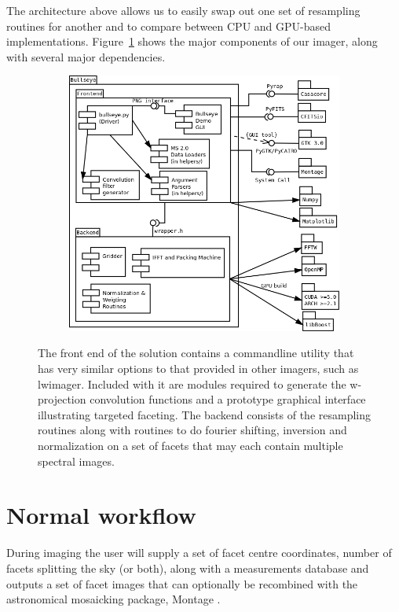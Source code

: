 The architecture above allows us to easily swap out one set of resampling routines for another and to compare between CPU and GPU-based implementations. Figure~\ref{fig_arch} shows
the major components of our imager, along with several major dependencies. 
\begin{figure}[h]
  \begin{mdframed}
    \centering
    \begin{subfigure}[b]{0.66\textwidth}
      \centering
      \includegraphics[width=\textwidth]{images/bullseye_arch.png}
      \caption{}
    \end{subfigure}  
    \caption[Bullseye Architecture]{The front end of the solution contains a commandline utility that has very similar options to that provided in other imagers, such as lwimager.
    Included with it are modules required to generate the w-projection convolution functions and a prototype graphical interface illustrating targeted faceting. The backend consists
    of the resampling routines along with routines to do fourier shifting, inversion and normalization on a set of facets that may each contain multiple spectral images.}
    \label{fig_arch}
  \end{mdframed}
\end{figure}
\section{Normal workflow}
During imaging the user will supply a set of facet centre coordinates, number of facets splitting the sky (or both), along with a measurements database and outputs a set of facet images that can optionally
be recombined with the astronomical mosaicking package, Montage \cite{jacob2004montage}.

